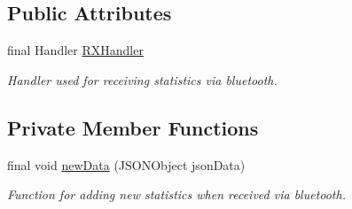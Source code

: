 \subsection*{Public Attributes}
\begin{DoxyCompactItemize}
\item 
final Handler \hyperlink{classcom_1_1jack_1_1motorbikestatistics_1_1_realtime_fragment_a7b39a40287200b7530c2d935e6717fa6}{R\+X\+Handler}
\begin{DoxyCompactList}\small\item\em Handler used for receiving statistics via bluetooth. \end{DoxyCompactList}\end{DoxyCompactItemize}
\subsection*{Private Member Functions}
\begin{DoxyCompactItemize}
\item 
final void \hyperlink{classcom_1_1jack_1_1motorbikestatistics_1_1_realtime_fragment_a675832561a8d63214b8f2cd59e901de5}{new\+Data} (J\+S\+O\+N\+Object json\+Data)
\begin{DoxyCompactList}\small\item\em Function for adding new statistics when received via bluetooth. \end{DoxyCompactList}\end{DoxyCompactItemize}
